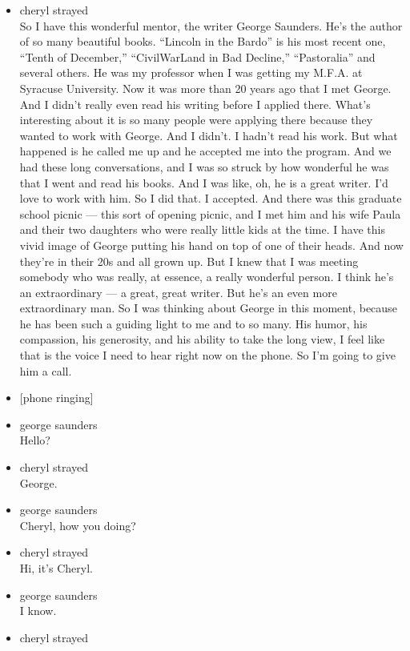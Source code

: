 \begin{itemize}
\item
  cheryl strayed\\
  So I have this wonderful mentor, the writer George Saunders. He's the
  author of so many beautiful books. ``Lincoln in the Bardo'' is his
  most recent one, ``Tenth of December,'' ``CivilWarLand in Bad
  Decline,'' ``Pastoralia'' and several others. He was my professor when
  I was getting my M.F.A. at Syracuse University. Now it was more than
  20 years ago that I met George. And I didn't really even read his
  writing before I applied there. What's interesting about it is so many
  people were applying there because they wanted to work with George.
  And I didn't. I hadn't read his work. But what happened is he called
  me up and he accepted me into the program. And we had these long
  conversations, and I was so struck by how wonderful he was that I went
  and read his books. And I was like, oh, he is a great writer. I'd love
  to work with him. So I did that. I accepted. And there was this
  graduate school picnic --- this sort of opening picnic, and I met him
  and his wife Paula and their two daughters who were really little kids
  at the time. I have this vivid image of George putting his hand on top
  of one of their heads. And now they're in their 20s and all grown up.
  But I knew that I was meeting somebody who was really, at essence, a
  really wonderful person. I think he's an extraordinary --- a great,
  great writer. But he's an even more extraordinary man. So I was
  thinking about George in this moment, because he has been such a
  guiding light to me and to so many. His humor, his compassion, his
  generosity, and his ability to take the long view, I feel like that is
  the voice I need to hear right now on the phone. So I'm going to give
  him a call.
\item
  {[}phone ringing{]}
\item
  george saunders\\
  Hello?
\item
  cheryl strayed\\
  George.
\item
  george saunders\\
  Cheryl, how you doing?
\item
  cheryl strayed\\
  Hi, it's Cheryl.
\item
  george saunders\\
  I know.
\item
  cheryl strayed\\

\end{itemize}
